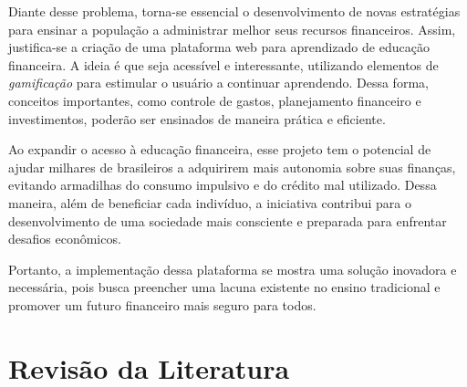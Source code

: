 \documentclass[
	article,			%
	12pt,				%
	oneside,			%
	a4paper,			%
	english,			%
	brazil,				%
	sumario=tradicional
	]{abntex2}
\begin{document}
    Diante desse problema, torna-se essencial o desenvolvimento de novas estratégias para ensinar a população a administrar melhor seus recursos financeiros. Assim, justifica-se a criação de uma plataforma web para aprendizado de educação financeira. A ideia é que seja acessível e interessante, utilizando elementos de \textit{gamificação} para estimular o usuário a continuar aprendendo. Dessa forma, conceitos importantes, como controle de gastos, planejamento financeiro e investimentos, poderão ser ensinados de maneira prática e eficiente.

    Ao expandir o acesso à educação financeira, esse projeto tem o potencial de ajudar milhares de brasileiros a adquirirem mais autonomia sobre suas finanças, evitando armadilhas do consumo impulsivo e do crédito mal utilizado. Dessa maneira, além de beneficiar cada indivíduo, a iniciativa contribui para o desenvolvimento de uma sociedade mais consciente e preparada para enfrentar desafios econômicos.

    Portanto, a implementação dessa plataforma se mostra uma solução inovadora e necessária, pois busca preencher uma lacuna existente no ensino tradicional e promover um futuro financeiro mais seguro para todos.

\section{Revisão da Literatura}

\begin{comment}

Especial atenção ao que este capítulo deve conter:
    \begin{citacao}
    "Revisão bibliográfica, conforme já comentado, não produz conhecimento novo, mas apenas supre as
    deficiências de conhecimento que o pesquisador tem em uma determinada área. Portanto, ela deve ser muito
    bem planejada e conduzida.
    (...)
    Quando se faz uma pesquisa em que alguma técnica de computação é aplicada a alguma outra área do
    conhecimento, é necessário que se faça a revisão bibliográfica sobre a técnica em si, sobre a área de aplicação e,
    mais do que tudo, sobre as aplicações que já foram tentadas com essa técnica ou com técnicas semelhantes na
    mesma área ou em áreas equivalentes. Exemplificando, um aluno pretende desenvolver um sistema
    multiagentes para auxiliar controladores de voo. Esse aluno deve conhecer profundamente os sistemas
    multiagentes e deverá conhecer também os problemas que os controladores de voo enfrentam para exercer sua
    profissão. Porém, ele não deve pensar, como algumas vezes acontece, que essa é a primeira vez que alguém vai
    tentar desenvolver um sistema multiagentes para esse tipo de aplicação."
    \cite{PESQUISA:RAUL}.
    \end{citacao}

Toda a revisão da literatura deve ser basear primordialmente em livros e artigos científicos ranqueados Qualis CAPES. De forma geral, todo parágrafo deve conter AO MENOS uma citação bibliográfica.

\end{comment}
\end{document}

